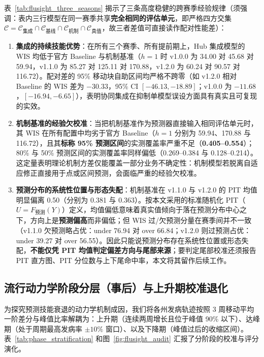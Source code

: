\documentclass[10pt,a4paper]{article}
\theoremstyle{plain}
\theoremstyle{definition}
\begin{document}
表~\ref{tab:flusight_three_seasons} 揭示了三条高度稳健的跨赛季经验规律（须强调：表内三行模型在同一赛季共享\textbf{完全相同的评估单元}，即严格四方交集 $\mathcal{C}=\mathcal{C}_{\text{集成}}\cap\mathcal{C}_{\text{基线}}\cap\mathcal{C}_{\text{机制}}\cap\mathcal{C}_{\text{真值}}$，故三者差值可直接读作配对性能差）：
\begin{enumerate}
\item \textbf{集成的持续技能优势}：在所有三个赛季、所有提前期上，Hub 集成模型的 WIS 均低于官方 Baseline 与机制基准（$h=1$ 时 v1.0.0 为 34.00 对 45.68 对 59.94，v1.1.0 为 85.27 对 125.11 对 170.88，v1.2.0 为 60.24 对 90.57 对 116.72）。配对差的 95\% 移动块自助区间均严格不跨零（如 v1.2.0 相对 Baseline 的 WIS 差为 $-30.33$，95\% CI $[-46.13, -18.89]$；v1.0.0 为 $-11.68$，$[-16.94, -6.65]$），表明协同集成在抑制单模型误设方面具有真实且可复现的实效。
\item \textbf{机制基准的经验欠校准}：当把机制基准作为预测器直接输入相同评估单元时，其 WIS 在所有配置中均劣于官方 Baseline（$h=1$ 分别为 59.94、170.88 与 116.72），且其\textbf{标称 95\% 预测区间}的实测覆盖率严重不足（\textbf{0.405--0.554}）；80\% 与 50\% 预测区间的实测覆盖率同样偏低（0.269--0.384 与 0.128--0.214）。这定量表明理论机制方差仅能覆盖一部分业务不确定性：机制模型若脱离自适应修正直接用于点或区间预测，会面临严重的经验欠校准。
\item \textbf{预测分布的系统性位置与形态失配}：机制基准在 v1.1.0 与 v1.2.0 的 PIT 均值明显偏离 0.50（分别为 0.381 与 0.363）。按本文采用的标准随机化 PIT（$U=F_{\text{预测}}(Y)$）定义，均值偏低意味着真实值倾向于落在预测分布中心之下，方向上是\textbf{预测偏高}而非偏低；但 WIS 过/欠预测分量在赛季间并不一致（v1.1.0 欠预测略占优：under 76.94 对 over 66.84；v1.2.0 则过预测占优：under 39.27 对 over 56.55）。因此只能说预测分布存在系统性位置或形态失配，\textbf{不能仅凭 PIT 均值判定偏差方向与尾部来源}；要判定尾部校准还须报告 PIT 直方图、PIT 分位数与上下尾命中率，本文将其留作后续工作。
\end{enumerate}

\subsection{流行动力学阶段分层（事后）与上升期校准退化}\label{sec:phase_collapse}

为探究预测技能衰退的动力学机制成因，我们将各州发病轨迹按照 3 周移动平均一阶差分与峰值比率解耦为：上升期（连续两周增长且位于峰值 90\% 以下）、达峰期（处于周期最高发病率 $\pm 10\%$ 窗口）、以及下降期（峰值过后的收缩区间）。表~\ref{tab:phase_stratification} 和图~\ref{fig:flusight_audit} 汇报了分阶段的校准与评分演化。
\end{document}
